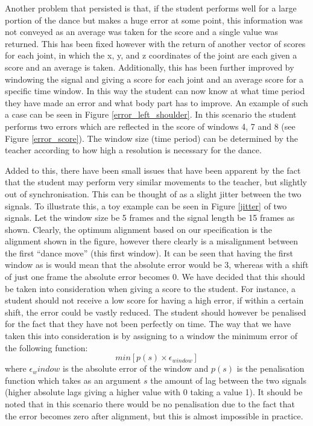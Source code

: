 \documentclass[11pt,a4paper]{article}
\begin{document}
\noindent
Another problem that persisted is that, if the student performs well for a large portion of the dance but makes a huge error at some point, this information was not conveyed as an average was taken for the score and a single value was returned. This has been fixed however with the return of another vector of scores for each joint, in which the x, y, and z coordinates of the joint are each given a score and an average is taken. Additionally, this has been further improved by windowing the signal and giving a score for each joint and an average score for a specific time window. In this way the student can now know at what time period they have made an error and what body part has to improve. An example of such a case can be seen in Figure \ref{error_left_shoulder}. In this scenario the student performs two errors which are reflected in the score of windows 4, 7 and 8 (see Figure \ref{error_score}). The window size (time period) can be determined by the teacher according to how high a resolution is necessary for the dance.
 
\noindent
Added to this, there have been small issues that have been apparent by the fact that the student may perform very similar movements to the teacher, but slightly out of synchronisation. This can be thought of as a slight jitter between the two signals. To illustrate this, a toy example can be seen in Figure \ref{jitter} of two signals. Let the window size be 5 frames and the signal length be 15 frames as shown. Clearly, the optimum alignment based on our specification is the alignment shown in the figure, however there clearly is a misalignment between the first ``dance move'' (this first window). It can be seen that having the first window as is would mean that the absolute error would be 3, whereas with a shift of just one frame the absolute error becomes 0. We have decided that this should be taken into consideration when giving a score to the student. For instance, a student should not receive a low score for having a high error, if within a certain shift, the error could be vastly reduced. The student should however be penalised for the fact that they have not been perfectly on time. The way that we have taken this into consideration is by assigning to a window the minimum error of the following function:
\begin{equation}
min\left[p(s) \times \epsilon_{window}\right]
\end{equation}
where $\epsilon_window$ is the absolute error of the window and $p(s)$ is the penalisation function which takes as an argument $s$ the amount of lag between the two signals (higher absolute lags giving a higher value with 0 taking a value 1). It should be noted that in this scenario there would be no penalisation due to the fact that the error becomes zero after alignment, but this is almost impossible in practice. 
\end{document}
